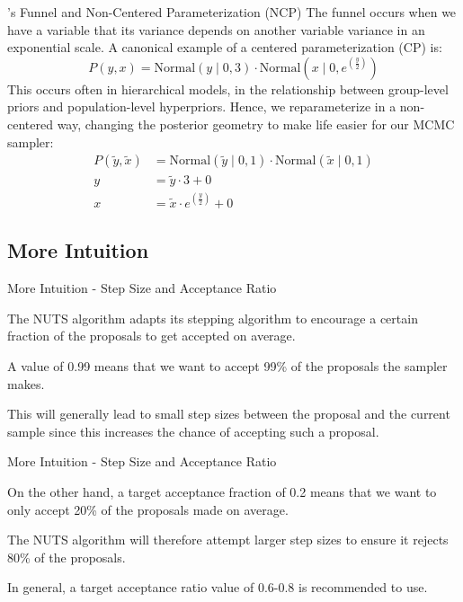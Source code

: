 \begin{frame}{\textcite{nealSliceSampling2003}'s Funnel and Non-Centered Parameterization (NCP)}
	\small
	The funnel occurs when we have a variable that its variance depends on another variable variance
	in an exponential scale.
	A canonical example of a centered parameterization (CP) is:
	$$
		P(y,x) = \text{Normal}(y \mid 0 ,3) \cdot
		\text{Normal}\left(x \mid 0, e^{\left(\frac{y}{2}\right)}\right)
	$$
	This occurs often in hierarchical models,
	in the relationship between group-level priors and population-level hyperpriors.
	Hence, we reparameterize in a non-centered way,
	changing the posterior geometry to make life easier for our MCMC sampler:
	$$
		\begin{aligned}
			P(\tilde{y},\tilde{x}) & = \text{Normal}(\tilde{y} \mid 0, 1) \cdot
			\text{Normal}(\tilde{x} \mid 0, 1)                                           \\
			y                      & = \tilde{y} \cdot 3 + 0                             \\
			x                      & = \tilde{x} \cdot  e^{\left(\frac{y}{2}\right)} + 0
		\end{aligned}
	$$
\end{frame}

\subsection{More Intuition}
\begin{frame}{More Intuition - Step Size and Acceptance Ratio}
	\begin{vfilleditems}
		\item The NUTS algorithm adapts its stepping algorithm to encourage a certain fraction of the proposals to get accepted on average.
		\item A value of 0.99 means that we want to accept 99\% of the proposals the sampler makes.
		\item This will generally lead to small step sizes between the proposal and the current sample since this increases the chance of accepting such a proposal.
	\end{vfilleditems}
\end{frame}

\begin{frame}{More Intuition - Step Size and Acceptance Ratio}
	\begin{vfilleditems}
		\item On the other hand, a target acceptance fraction of 0.2 means that we want to only accept 20\% of the proposals made on average.
		\item The NUTS algorithm will therefore attempt larger step sizes to ensure it rejects 80\% of the proposals.
		\item In general, a target acceptance ratio value of 0.6-0.8 is recommended to use.
	\end{vfilleditems}
\end{frame}

